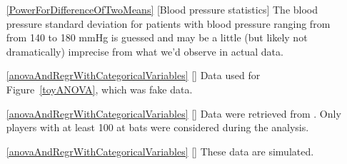 \begin{itemize}
\item[\ref{PowerForDifferenceOfTwoMeans}]
    [Blood pressure statistics]
    The blood pressure standard deviation for patients
    with blood pressure ranging from from 140 to 180 mmHg
    is guessed and may be a little (but likely not dramatically)
    imprecise from what we'd observe in actual data.

\item[\ref{anovaAndRegrWithCategoricalVariables}]
    [\datalink{toy\_anova}]
    Data used for Figure~\ref{toyANOVA}, which was fake data.
\item[\ref{anovaAndRegrWithCategoricalVariables}]
    [\datalink{mlb\_players\_18}]
    Data were retrieved from
    .
    Only players with at least 100 at bats were considered
    during the analysis.
\item[\ref{anovaAndRegrWithCategoricalVariables}]
    [\datalink{class\_data}]
    These data are simulated.

\end{itemize}






\section{}
\label{ch_regr_simple_linear_data}

